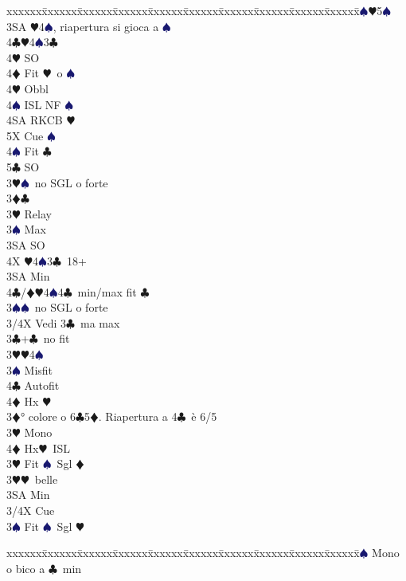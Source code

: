 \documentclass[a4paper,italian]{article}
\newcommand{\BC}{\textcolor{OliveGreen}{$\clubsuit$}}
\newcommand{\BD}{\textcolor{RedOrange}{$\vardiamondsuit$}}
\newcommand{\BH}{\textcolor{Red2}{$\varheartsuit${}}}
\newcommand{\BS}{\textcolor{MidnightBlue}{$\spadesuit${}}}
\newenvironment{bidtable}
{\begin{tabbing}

    xxxxxx\=xxxxxx\=xxxxxx\=xxxxxx\=xxxxxx\=xxxxxx\=xxxxxx\=xxxxxx\=xxxxxx\=xxxxxx\=\kill}
{\end{tabbing} }%
\begin{document}
\begin{multicols}{2}
\begin{bidtable}
        3\BS {}\BH 5\BS \\
        3SA \BH 4\BS , riapertura si gioca a \BS \\
        4\BC {}\BH 4\BS 3\BC \+\\
        4\BH \> SO\\
        4\BD \> Fit \BH\ o \BS \+\\
        4\BH \> Obbl\+\\
        4\BS \> ISL NF \BS \\
        4SA \> RKCB \BH \\
        5X \> Cue \BS \-\-\\
        4\BS \> Fit \BC \\
        5\BC \> SO\-\-\\
        3\BH {}\BS\ no SGL o forte\-\\
        3\BD {}\BC \+\\
        3\BH \> Relay\+\\
        3\BS \> Max\+\\
        3SA \> SO\+\\
        4X \BH4\BS3\BC\ 18+\-\-\\
        3SA \> Min\\
        4\BC/\BD {}\BH 4\BS 4\BC\ min/max fit \BC \-\\
        3\BS {}\BS\ no SGL o forte\-\\
        3/4X \> Vedi 3\BC\ ma max\-\\
        3\BC {}+\BC\ no fit\+\\
        3\BH {}\BH 4\BS \+\\
        3\BS \> Misfit\\
        4\BC \> Autofit\\
        4\BD \> Hx \BH \-\-\\
        3\BD {}° colore o 6\BC 5\BD . Riapertura a 4\BC\ è 6/5\+\\
        3\BH \> Mono\+\\
        4\BD \> Hx\BH\ ISL\-\-\\
        3\BH \> Fit \BS\ Sgl \BD \+\\
        3\BH {}\BH\ belle\\
        3SA \> Min\\
        3/4X \> Cue\-\\
        3\BS \> Fit \BS\ Sgl \BH \-\\
    \end{bidtable}
    \columnbreak
    \begin{bidtable}
        2\BS \> Mono o bico a \BC\ min\+\\

\end{bidtable}
\end{multicols}
\end{document}
